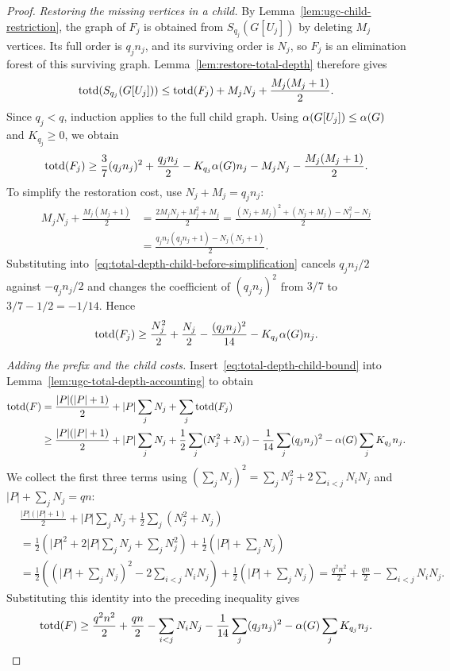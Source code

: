\begin{proof}
\emph{Restoring the missing vertices in a child.}
By Lemma~\ref{lem:ugc-child-restriction}, the graph of $F_j$ is
obtained from $S_{q_j}(G[U_j])$ by deleting
$M_j$ vertices. Its full order is $q_jn_j$, and its surviving
order is $N_j$, so $F_j$ is an elimination forest of this surviving
graph. Lemma~\ref{lem:restore-total-depth} therefore gives
\[
 \operatorname{totd}(S_{q_j}(G[U_j]))
 \leq\operatorname{totd}(F_j)+M_jN_j+\frac{M_j(M_j+1)}2.
\]
Since $q_j<q$, induction applies to the full child graph. Using
$\alpha(G[U_j])\leq\alpha(G)$ and $K_{q_j}\geq0$, we obtain
\begin{equation}\label{eq:total-depth-child-before-simplification}
 \operatorname{totd}(F_j)\geq\frac37(q_jn_j)^2+\frac{q_jn_j}{2}
 -K_{q_j}\alpha(G)n_j-M_jN_j-\frac{M_j(M_j+1)}2.
\end{equation}
To simplify the restoration cost, use $N_j+M_j=q_jn_j$:
\[
 \begin{aligned}
 M_jN_j+\frac{M_j(M_j+1)}2
 &=\frac{2M_jN_j+M_j^2+M_j}{2}
 =\frac{(N_j+M_j)^2+(N_j+M_j)-N_j^2-N_j}{2}\\
 &=\frac{q_jn_j(q_jn_j+1)-N_j(N_j+1)}2.
 \end{aligned}
\]
Substituting into~\eqref{eq:total-depth-child-before-simplification}
cancels $q_jn_j/2$ against $-q_jn_j/2$ and changes the coefficient
of $(q_jn_j)^2$ from $3/7$ to $3/7-1/2=-1/14$. Hence
\begin{equation}\label{eq:total-depth-child-bound}
 \operatorname{totd}(F_j)\geq
 \frac{N_j^2}{2}+\frac{N_j}{2}
 -\frac{(q_jn_j)^2}{14}-K_{q_j}\alpha(G)n_j.
\end{equation}

\emph{Adding the prefix and the child costs.}
Insert~\eqref{eq:total-depth-child-bound} into
Lemma~\ref{lem:ugc-total-depth-accounting} to obtain
\[
 \begin{aligned}
 \operatorname{totd}(F)
 &=\frac{|P|(|P|+1)}2+|P|\sum_jN_j+\sum_j\operatorname{totd}(F_j)\\
 &\ge\frac{|P|(|P|+1)}2+|P|\sum_jN_j
       +\frac12\sum_j(N_j^2+N_j)
       -\frac1{14}\sum_j(q_jn_j)^2
       -\alpha(G)\sum_jK_{q_j}n_j.
 \end{aligned}
\]
We collect the first three terms using
$(\sum_jN_j)^2=\sum_jN_j^2+2\sum_{i<j}N_iN_j$ and
$|P|+\sum_jN_j=qn$:
\[
 \begin{aligned}
 &\frac{|P|(|P|+1)}2+|P|\sum_jN_j+\frac12\sum_j(N_j^2+N_j)\\
 &=\frac12\left(|P|^2+2|P|\sum_jN_j+\sum_jN_j^2\right)
   +\frac12\left(|P|+\sum_jN_j\right)\\
 &=\frac12\left(\left(|P|+\sum_jN_j\right)^2
                 -2\sum_{i<j}N_iN_j\right)
   +\frac12\left(|P|+\sum_jN_j\right)
 =\frac{q^2n^2}{2}+\frac{qn}{2}-\sum_{i<j}N_iN_j.
 \end{aligned}
\]
Substituting this identity into the preceding inequality gives
\begin{equation}\label{eq:total-depth-combined-children}
 \operatorname{totd}(F)\geq\frac{q^2n^2}{2}+\frac{qn}2-\sum_{i<j}N_iN_j
 -\frac1{14}\sum_j(q_jn_j)^2-\alpha(G)\sum_jK_{q_j}n_j.
\end{equation}


\end{proof}

